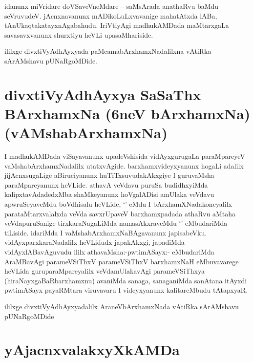 \begin{artha}
idanunx miVridare doVSaveVneMdare -- saMsArada anathaRvu baMdu seVruvudeV. jAcnxnavanunx 
mADikoLuLxvavanige mahatAtxda lABa, tAnUkaqtakatayxnAgabahudu. IriVtiyAgi madhukAMDada 
maMtarxgaLa savasavxvanunx shurxtiyu heVLi upasaMhariside.
\end{artha}

\begin{center}
ililxge divxtiVyAdhAyxyada paMcamabArxhamxNadalilxna vAtiRka sArAMshavu pUNaRgoMDide.
\end{center}

\section*{divxtiVyAdhAyxya SaSaThx BArxhamxNa (6neV bArxhamxNa) (vAMshabArxhamxNa)}

\begin{center}


\end{center}

\begin{artha}
I madhukAMDada viSayavanunx upadeVshisida vidAyxgurugaLa paraMpareyeV vaMshabArxhamxNadalilx utatxvAgide. barxhamxvideyxyanunx hogaLi adalilx jijAcnxsugaLige aBiruciyanunx huTiTxsuvudakAkxgiye I guruvaMsha paraMpareyanunx heVLide. athavA veVdavu puruSa budidhxyiMda kalipxtavAdadedxMba shaMkeyanunx hoVgalADisi amUlaka veVdavu apwruSeyaveMdu boVdhisalu heVLide, `\stext'  eMdu I bArxhamXNadakoneyalilx parataMtarxvalalxda veVda savxrUpaveV barxhamxpadada athaRvu aMtaha veVdapuruSanige tirxkaraNagaLiMda namasAkxraveMdu `\stext' eMbudariMda tiLiside. idariMda I vaMshabArxhamxNaBAgavanunx japisabeVku. vidAyxparxkaraNadalilx heVLidudx japakAkxgi, japadiMda vidAyxlABavAguvudu ililx athavaMsha:-pwtimASayx:- eMbudariMda AraMBavAgi parameVSiThxV parameVSiThxV barxhamxNaH eMbuvavarege heVLida guruparaMpareyalilx veVdamUlakavAgi parameVSiThxya (hiraNayxgaBaRbarxhamxnu) avaniMda sanaga, sanaganiMda sanAtana itAyxdi pwtimASayx payaRMtara viruvavaru I videyxyanunx kalitareMbudu tAtapxyaR.
\end{artha}

\begin{center}
ililxge divxtiVyAdhAyxyadalilx AraneVbArxhamxNada vAtiRka sArAMshavu  pUNaRgoMDide
\end{center}

\section*{yAjacnxvalakxyXkAMDa}

